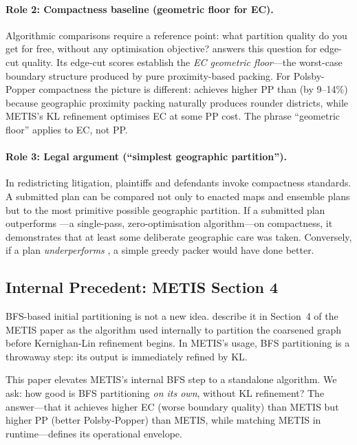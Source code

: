 \paragraph{Role 2: Compactness baseline (geometric floor for EC).}
Algorithmic comparisons require a reference point: what partition quality
do you get for free, without any optimisation objective?
\bfsg{} answers this question for edge-cut quality.
Its edge-cut scores establish the \emph{EC geometric floor}---the worst-case
boundary structure produced by pure proximity-based packing.
For Polsby-Popper compactness the picture is different: \bfsg{} achieves
higher PP than \metis{} (by 9--14\%) because geographic proximity packing naturally
produces rounder districts, while METIS's KL refinement optimises EC at
some PP cost.
The phrase ``geometric floor'' applies to EC, not PP.

\paragraph{Role 3: Legal argument (``simplest geographic partition'').}
In redistricting litigation, plaintiffs and defendants invoke compactness
standards.
A submitted plan can be compared not only to enacted maps and ensemble
plans but to the most primitive possible geographic partition.
If a submitted plan outperforms \bfsg{}---a single-pass, zero-optimisation
algorithm---on compactness, it demonstrates that at least some deliberate
geographic care was taken.
Conversely, if a plan \emph{underperforms} \bfsg{}, a simple greedy packer
would have done better.

\subsection{Internal Precedent: METIS Section 4}

BFS-based initial partitioning is not a new idea.
\citet{karypis1998} describe it in Section~4 of the METIS paper as the
algorithm used internally to partition the coarsened graph before
Kernighan-Lin refinement begins.
In METIS's usage, BFS partitioning is a throwaway step: its output is
immediately refined by KL.

This paper elevates METIS's internal BFS step to a standalone algorithm.
We ask: how good is BFS partitioning \emph{on its own}, without KL
refinement?
The answer---that it achieves higher EC (worse boundary quality) than
METIS but higher PP (better Polsby-Popper) than METIS, while matching
METIS in runtime---defines its operational envelope.

